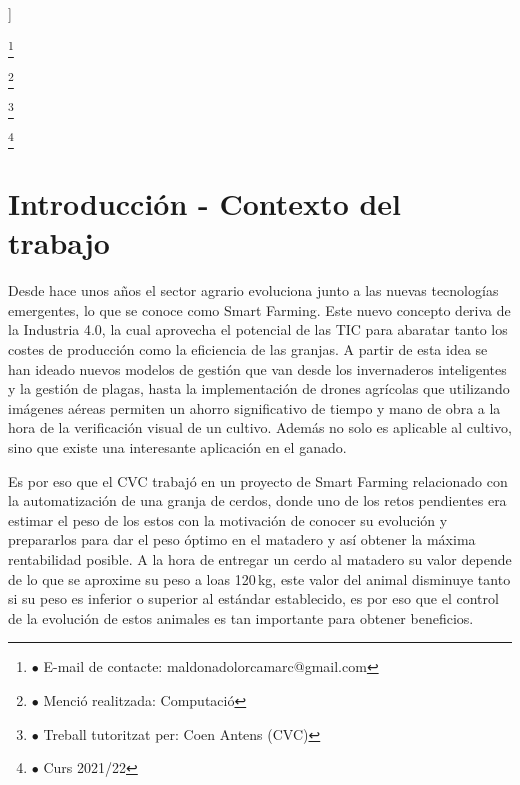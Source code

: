 ﻿\documentclass[10pt,a4paper,twocolumn,twoside]{article}
\newcommand\blfootnote[1]{%
  \begingroup
  \renewcommand\thefootnote{}\footnote{#1}%
  \addtocounter{footnote}{-1}%
  \endgroup
}
\begin{document}
\begin{@twocolumnfalse}
\begin{center}
\bigskip

{\vrule depth 0pt height 0.5pt width 4cm\hspace{7.5pt}%
%
\hspace{7.5pt}\vrule depth 0pt height 0.5pt width 4cm\relax}

\end{center}

\bigskip
\end{@twocolumnfalse}]

\blfootnote{$\bullet$ E-mail de contacte: maldonadolorcamarc@gmail.com}
\blfootnote{$\bullet$ Menció realitzada: Computació}
\blfootnote{$\bullet$ Treball tutoritzat per: Coen Antens (CVC)}
\blfootnote{$\bullet$ Curs 2021/22}

\section{Introducción - Contexto del trabajo}

\lettrine[lines=3]{D}{}esde hace unos años el sector agrario evoluciona junto a las nuevas tecnologías emergentes, lo que se conoce como Smart Farming. Este nuevo concepto deriva de la Industria 4.0, la cual aprovecha el potencial de las TIC para abaratar tanto los costes de producción como la eficiencia de las granjas. A partir de esta idea se han ideado nuevos modelos de gestión que van desde los invernaderos inteligentes y la gestión de plagas, hasta la implementación de drones agrícolas que utilizando imágenes aéreas permiten un ahorro significativo de tiempo y mano de obra a la hora de la verificación visual de un cultivo. Además no solo es aplicable al cultivo, sino que existe una interesante aplicación en el ganado.

Es por eso que el CVC trabajó en un proyecto de Smart Farming relacionado con la automatización de una granja de cerdos, donde uno de los retos pendientes era estimar el peso de los estos con la motivación de conocer su evolución y prepararlos para dar el peso óptimo en el matadero y así obtener la máxima rentabilidad posible. A la hora de entregar un cerdo al matadero su valor depende de lo que se aproxime su peso a loas 120 kg, este valor del animal disminuye tanto si su peso es inferior o superior al estándar establecido, es por eso que el control de la evolución de estos animales es tan importante para obtener beneficios.
\end{document}
